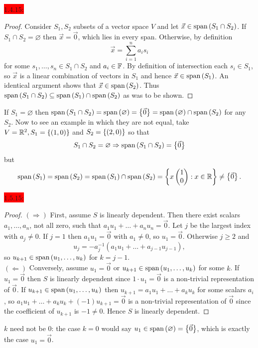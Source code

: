 \documentclass{exam}
\begin{document}
  \colorbox{red}{\underline{$1.4.15$}:}
  \begin{solution}
    \begin{proof}
      Consider $S_1, S_2$ subsets of a vector space $V$ and let $\vec{x} \in \text{span}\left({S_1 \cap S_2}\right)$. If $S_1 \cap S_2 = \varnothing$ then $\vec{x} = \vec{0}$, which lies in every span. Otherwise, by definition
      \[
        \vec{x} = \sum_{i=1}^{n} a_i s_i
      \]
      for some $s_1, \dots, s_n \in S_1 \cap S_2$ and $a_i \in \mathbb F$. By definition of intersection each $s_i \in S_1$, so $\vec{x}$ is a linear combination of vectors in $S_1$ and hence $\vec{x} \in \text{span}\left({S_1}\right)$. An identical argument shows that $\vec{x} \in \text{span}\left({S_2}\right)$. Thus $\text{span}\left({S_1 \cap S_2}\right) \subseteq \text{span}\left({S_1}\right) \cap \text{span}\left({S_2}\right)$ as was to be shown.
    \end{proof}

    If $S_1 = \varnothing$ then $\text{span}\left({S_1 \cap S_2}\right) = \text{span}\left({\varnothing}\right) = \left\{\vec{0} \right\} = \text{span}\left({\varnothing}\right) \cap \text{span}\left({S_2}\right)$ for any $S_2$. Now to see an example in which they are not equal, take $V = \mathbb R^2, S_1 = \left\{(1, 0) \right\}$ and $S_2 = \left\{(2, 0) \right\}$ so that 
    \[
      S_1 \cap S_2 = \varnothing \Rightarrow \text{span}\left({S_1 \cap S_2}\right) = \left\{\vec{0} \right\} 
    \]
    but 
    \[
      \text{span}\left({S_1}\right) = \text{span}\left({S_2}\right) = \text{span}\left({S_1}\right) \cap \text{span}\left({S_2}\right) = \left\{x\begin{pmatrix}
        1 \\ 0
      \end{pmatrix} : x \in \mathbb R \right\} \neq \left\{\vec{0} \right\}.
    \]
  \end{solution}

  \colorbox{red}{\underline{$1.5.15$}:}
  \begin{solution}
    \begin{proof}
      $(\Rightarrow)$ First, assume $S$ is linearly dependent. Then there exist scalars $a_1, \dots, a_n$, not all zero, such that $a_1u_1 + \dots + a_nu_n = \vec{0}$. Let $j$ be the largest index with $a_j \neq 0$. If $j = 1$ then $a_1u_1 = \vec{0}$ with $a_1 \neq 0$, so $u_1 = \vec{0}$. Otherwise $j \geq 2$ and
      \[
        u_j = -a_j^{-1}\left(a_1u_1 + \dots + a_{j-1}u_{j-1}\right),
      \]
      so $u_{k+1} \in \text{span}\left({u_1, \dots, u_k}\right)$ for $k = j - 1$. \\
      $(\Leftarrow)$ Conversely, assume $u_1 = \vec{0}$ or $u_{k+1} \in \text{span}\left({u_1, \dots, u_k}\right)$ for some $k$. If $u_1 = \vec{0}$ then $S$ is linearly dependent since $1 \cdot u_1 = \vec{0}$ is a non-trivial representation of $\vec{0}$. If $u_{k+1} \in \text{span}\left({u_1, \dots, u_k}\right)$ then $u_{k+1} = a_1u_1 + \dots + a_ku_k$ for some scalars $a_i$, so $a_1u_1 + \dots + a_ku_k + (-1)u_{k+1} = \vec{0}$ is a non-trivial representation of $\vec{0}$ since the coefficient of $u_{k+1}$ is $-1 \neq 0$. Hence $S$ is linearly dependent.
    \end{proof}

    $k$ need not be $0$: the case $k = 0$ would say $u_1 \in \text{span}\left({\varnothing}\right) = \left\{\vec{0} \right\}$, which is exactly the case $u_1 = \vec{0}$.
  \end{solution}
\end{document}
